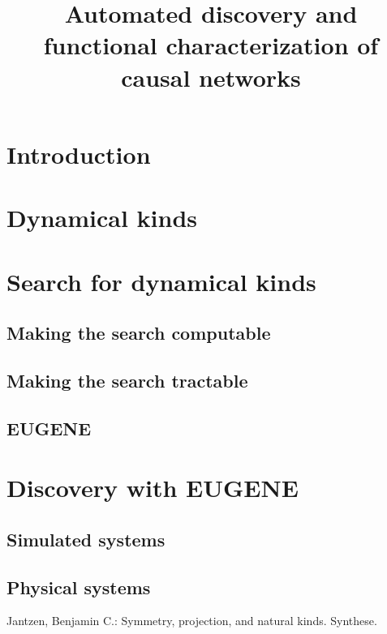 \documentclass{llncs}
\title{Automated discovery and functional characterization of causal networks} %
\author{}
\begin{document}
\maketitle


\section{Introduction}

\section{Dynamical kinds}

\section{Search for dynamical kinds}
\subsection{Making the search computable}
\subsection{Making the search tractable}
\subsection{EUGENE}

\section{Discovery with EUGENE}
\subsection{Simulated systems}
\subsection{Physical systems}




\begin{thebibliography}{} %
		Jantzen, Benjamin C.:
		Symmetry, projection, and natural kinds.
		Synthese.
\end{thebibliography}
\end{document}
